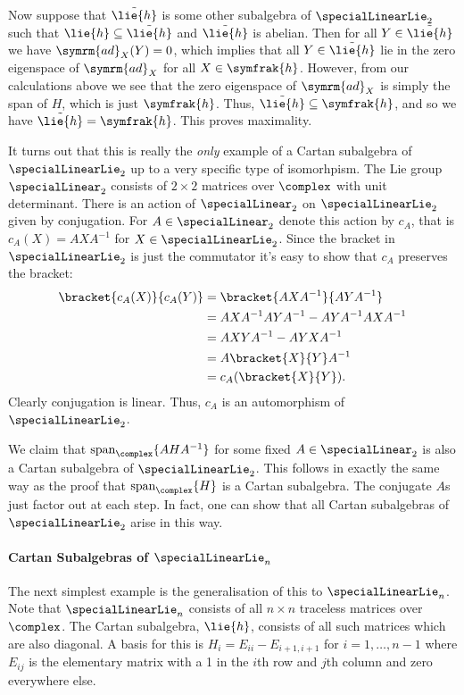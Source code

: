 \documentclass[fleqn]{NotesClass}
\DeclareMathOperator{\Span}{span}
\newcommand{\ad}{\symrm{ad}}
\newcommand{\csa}{\symfrak{h}}
\begin{document}
    Now suppose that \(\tilde{\lie{h}}\) is some other subalgebra of \(\specialLinearLie_2\) such that \(\lie{h} \subseteq \tilde{\lie{h}}\) and \(\tilde{\lie{h}}\) is abelian.
    Then for all \(Y \in \tilde{\lie{h}}\) we have \(\ad_X(Y) = 0\), which implies that all \(Y \in \tilde{\lie{h}}\) lie in the zero eigenspace of \(\ad_X\) for all \(X \in \csa\).
    However, from our calculations above we see that the zero eigenspace of \(\ad_X\) is simply the span of \(H\), which is just \(\csa\).
    Thus, \(\tilde{\lie{h}} \subseteq \csa\), and so we have \(\tilde{\lie{h}} = \csa\).
    This proves maximality.
    
    It turns out that this is really the \emph{only} example of a Cartan subalgebra of \(\specialLinearLie_2\) up to a very specific type of isomorhpism.
    The Lie group \(\specialLinear_2\) consists of \(2 \times 2\) matrices over \(\complex\) with unit determinant.
    There is an action of \(\specialLinear_2\) on \(\specialLinearLie_2\) given by conjugation.
    For \(A \in \specialLinear_2\) denote this action by \(c_A\), that is \(c_A(X) = AXA^{-1}\) for \(X \in \specialLinearLie_2\).
    Since the bracket in \(\specialLinearLie_2\) is just the commutator it's easy to show that \(c_A\) preserves the bracket:
    \begin{align}
        \bracket{c_A(X)}{c_A(Y)} &= \bracket{AXA^{-1}}{AYA^{-1}}\\
        &= AXA^{-1}AYA^{-1} - AYA^{-1}AXA^{-1}\\
        &= AXYA^{-1} - AYXA^{-1}\\
        &= A\bracket{X}{Y}A^{-1}\\
        &= c_A(\bracket{X}{Y}).
    \end{align}
    Clearly conjugation is linear.
    Thus, \(c_A\) is an automorphism of \(\specialLinearLie_2\).
    
    We claim that \(\Span_{\complex}\{AHA^{-1}\}\) for some fixed \(A \in \specialLinear_2\) is also a Cartan subalgebra of \(\specialLinearLie_2\).
    This follows in exactly the same way as the proof that \(\Span_{\complex}\{H\}\) is a Cartan subalgebra.
    The conjugate \(A\)s just factor out at each step.
    In fact, one can show that all Cartan subalgebras of \(\specialLinearLie_2\) arise in this way.
    
    
    \paragraph{Cartan Subalgebras of \(\specialLinearLie_n\)}
    The next simplest example is the generalisation of this to \(\specialLinearLie_n\).
    Note that \(\specialLinearLie_n\) consists of all \(n \times n\) traceless matrices over \(\complex\).
    The Cartan subalgebra, \(\lie{h}\), consists of all such matrices which are also diagonal.
    A basis for this is \(H_i = E_{ii} - E_{i+1,i+1}\) for \(i=1, \dotsc, n-1\) where \(E_{ij}\) is the elementary matrix with a 1 in the \(i\)th row and \(j\)th column and zero everywhere else.
    
\end{document}
